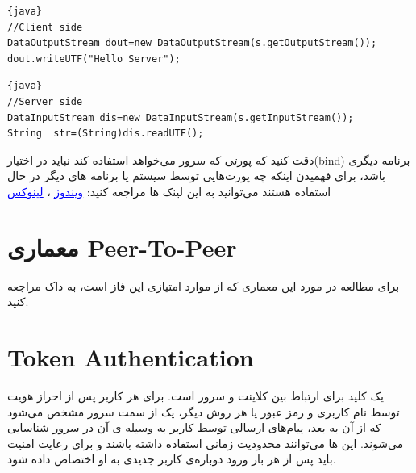 \documentclass[]{article}
\begin{document}
\begin{enumerate}
\begin{latin}

\begin{lstlisting}{java}
//Client side
DataOutputStream dout=new DataOutputStream(s.getOutputStream());  dout.writeUTF("Hello Server");  			
\end{lstlisting}

\end{latin}

\begin{latin}

\begin{lstlisting}{java}
//Server side
DataInputStream dis=new DataInputStream(s.getInputStream());
String  str=(String)dis.readUTF();  

\end{lstlisting}

\end{latin}



\end{enumerate}

دقت کنید که پورتی که سرور می‌خواهد استفاده کند نباید در اختیار(bind) برنامه دیگری باشد، برای فهمیدن اینکه چه پورت‌هایی توسط سیستم یا برنامه های دیگر در حال استفاده هستند می‌توانید به این لینک ها مراجعه کنید:
\href{https://www.howtogeek.com/howto/28609/how-can-i-tell-what-is-listening-on-a-tcpip-port-in-windows/}{\textcolor{blue}{\underline{{ ویندوز}}}}
  ،
   \href{https://www.cyberciti.biz/faq/unix-linux-check-if-port-is-in-use-command/}{\textcolor{blue}{\underline{{لینوکس}}}}


\section*{{\titr معماری Peer-To-Peer}}

برای مطالعه در مورد این معماری که از موارد امتیازی این فاز است، به \textcolor{CustomColor}{داک } مراجعه کنید.


\section*{{\titr Token Authentication }}

 یک کلید برای ارتباط بین کلاینت و سرور است. برای هر کاربر پس از احراز هویت توسط نام کاربری و رمز عبور یا هر روش دیگر، یک   از سمت سرور مشخص می‌شود که از آن به بعد، پیام‌های ارسالی توسط کاربر به وسیله ی آن  در سرور شناسایی می‌شوند. این  ها می‌توانند محدودیت زمانی استفاده داشته باشند و برای رعایت امنیت باید پس از هر بار ورود دوباره‌ی کاربر  جدیدی به او اختصاص داده شود.
\end{document}
